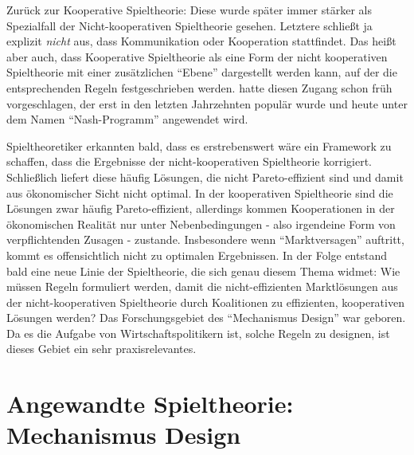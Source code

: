 Zurück zur Kooperative Spieltheorie: Diese wurde später immer stärker als Spezialfall der Nicht-kooperativen Spieltheorie gesehen. Letztere schließt ja explizit \textit{nicht} aus, dass Kommunikation oder Kooperation stattfindet. Das heißt aber auch, dass Kooperative Spieltheorie als eine Form der nicht kooperativen Spieltheorie mit einer zusätzlichen "`Ebene"' dargestellt werden kann, auf der die entsprechenden Regeln festgeschrieben werden. \textcite{Nash1953} hatte diesen Zugang schon früh vorgeschlagen, der erst in den letzten Jahrzehnten populär wurde und heute unter dem Namen "`Nash-Programm"' angewendet wird.

Spieltheoretiker erkannten bald, dass es erstrebenswert wäre ein Framework zu schaffen, dass die Ergebnisse der nicht-kooperativen Spieltheorie korrigiert. Schließlich liefert diese häufig Lösungen, die nicht Pareto-effizient sind und damit aus ökonomischer Sicht nicht optimal. In der kooperativen Spieltheorie sind die Lösungen zwar häufig Pareto-effizient, allerdings kommen Kooperationen in der ökonomischen Realität nur unter Nebenbedingungen - also irgendeine Form von verpflichtenden Zusagen -  zustande. Insbesondere wenn "`Marktversagen"' auftritt, kommt es offensichtlich nicht zu optimalen Ergebnissen. In der Folge entstand bald eine neue Linie der Spieltheorie, die sich genau diesem Thema widmet: Wie müssen Regeln formuliert werden, damit die nicht-effizienten Marktlösungen aus der nicht-kooperativen Spieltheorie durch Koalitionen zu effizienten, kooperativen Lösungen werden? Das Forschungsgebiet des "`Mechanismus Design"' war geboren. Da es die Aufgabe von Wirtschaftspolitikern ist, solche Regeln zu designen, ist dieses Gebiet ein sehr praxisrelevantes.


\section{Angewandte Spieltheorie: Mechanismus Design}

